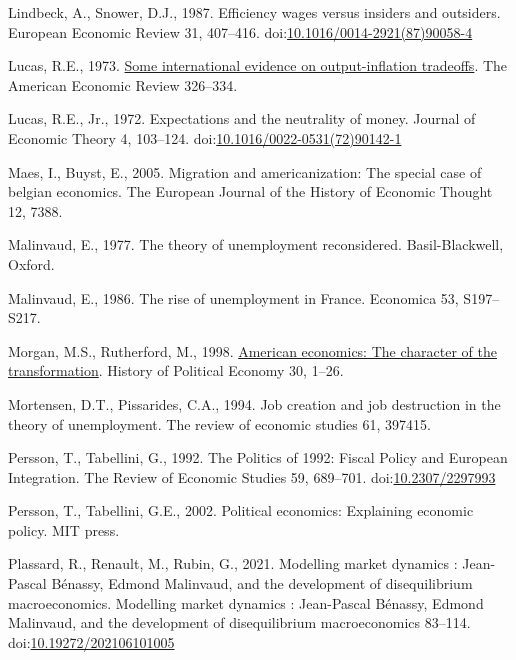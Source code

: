 \documentclass[
  12pt,
  onecolumn]{article}
\newlength{\cslhangindent}
\newlength{\cslentryspacingunit} %
\newenvironment{CSLReferences}[2] %
 {%
  \setlength{\parindent}{0pt}
  \ifodd #1
  \let\oldpar\par
  \def\par{\hangindent=\cslhangindent\oldpar}
  \fi
  \setlength{\parskip}{#2\cslentryspacingunit}
 }%
 {}
\begin{document}
\begin{CSLReferences}{1}{0}
\leavevmode{}%
Lindbeck, A., Snower, D.J., 1987. Efficiency wages versus insiders and
outsiders. European Economic Review 31, 407--416.
doi:\href{https://doi.org/10.1016/0014-2921(87)90058-4}{10.1016/0014-2921(87)90058-4}

\leavevmode{}%
Lucas, R.E., 1973. \href{http://www.jstor.org/stable/1914364}{Some
international evidence on output-inflation tradeoffs}. The American
Economic Review 326--334.

\leavevmode{}%
Lucas, R.E., Jr., 1972. Expectations and the neutrality of money.
Journal of Economic Theory 4, 103--124.
doi:\href{https://doi.org/10.1016/0022-0531(72)90142-1}{10.1016/0022-0531(72)90142-1}

\leavevmode{}%
Maes, I., Buyst, E., 2005. Migration and americanization: The special
case of belgian economics. The European Journal of the History of
Economic Thought 12, 7388.

\leavevmode{}%
Malinvaud, E., 1977. The theory of unemployment reconsidered.
{Basil-Blackwell}, {Oxford}.

\leavevmode{}%
Malinvaud, E., 1986. The rise of unemployment in {France}. Economica 53,
S197--S217.

\leavevmode{}%
Morgan, M.S., Rutherford, M., 1998.
\href{http://search.ebscohost.com/login.aspx?direct=true\&db=bth\&AN=7752144\&lang=fr\&site=ehost-live}{American
economics: The character of the transformation}. History of Political
Economy 30, 1--26.

\leavevmode{}%
Mortensen, D.T., Pissarides, C.A., 1994. Job creation and job
destruction in the theory of unemployment. The review of economic
studies 61, 397415.

\leavevmode{}%
Persson, T., Tabellini, G., 1992. The {Politics} of 1992: {Fiscal
Policy} and {European Integration}. The Review of Economic Studies 59,
689--701. doi:\href{https://doi.org/10.2307/2297993}{10.2307/2297993}

\leavevmode{}%
Persson, T., Tabellini, G.E., 2002. Political economics: Explaining
economic policy. {MIT press}.

\leavevmode{}%
Plassard, R., Renault, M., Rubin, G., 2021. Modelling market dynamics :
{Jean-Pascal Bénassy}, {Edmond Malinvaud}, and the development of
disequilibrium macroeconomics. Modelling market dynamics : Jean-Pascal
Bénassy, Edmond Malinvaud, and the development of disequilibrium
macroeconomics 83--114.
doi:\href{https://doi.org/10.19272/202106101005}{10.19272/202106101005}


\end{CSLReferences}
\end{document}
